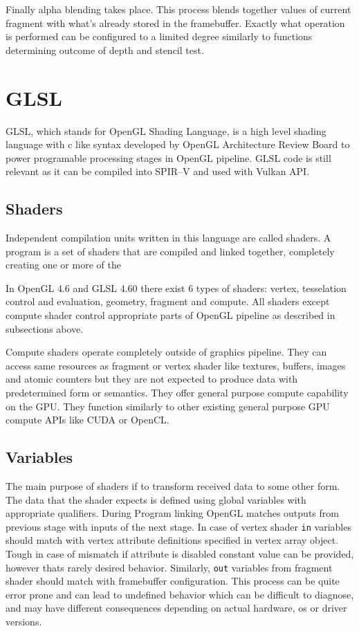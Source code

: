 Finally alpha blending takes place. This process blends together values of current fragment with what's already stored in the framebuffer.
Exactly what operation is performed can be configured to a limited degree similarly to functions determining outcome of depth and stencil test.

\section{GLSL}

GLSL, which stands for OpenGL Shading Language, is a high level shading language with c like syntax developed by OpenGL Architecture Review Board to power programable processing stages in OpenGL pipeline. 
GLSL code is still relevant as it can be compiled into SPIR--V and used with Vulkan API.

\subsection*{Shaders}

Independent compilation units written in this language are called shaders. A program is a set of
shaders that are compiled and linked together, completely creating one or more of the

In OpenGL 4.6 and GLSL 4.60 there exist 6 types of shaders: vertex, tesselation control and evaluation, geometry, fragment and compute.
All shaders except compute shader control appropriate parts of OpenGL pipeline as described in subsections above. 

Compute shaders operate completely outside of graphics pipeline. They can access same resources as fragment or vertex shader like textures, buffers, images and atomic counters
but they are not expected to produce data with predetermined form or semantics. They offer general purpose compute capability on the GPU. 
They function similarly to other existing general purpose GPU compute APIs like CUDA or OpenCL.

\subsection{Variables}

The main purpose of shaders if to transform received data to some other form. The data that the shader expects is defined using global variables with appropriate qualifiers.
During Program linking OpenGL matches outputs from previous stage with inputs of the next stage. 
In case of vertex shader \texttt{in} variables should match with vertex attribute definitions specified in vertex array object.
Tough in case of mismatch if attribute is disabled constant value can be provided, however thats rarely desired behavior.
Similarly, \texttt{out} variables from fragment shader should match with framebuffer configuration.
This process can be quite error prone and can lead to undefined behavior which can be difficult to diagnose, and may have different consequences depending on actual hardware, os or driver versions.

